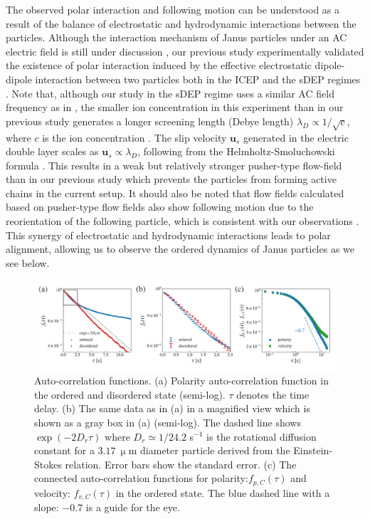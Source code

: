 \documentclass[%
 reprint,
 amsmath,amssymb,
 aps,
 floatfix
]{revtex4-2}
\begin{document}
The observed polar interaction and following motion can be understood as a result of the balance of electrostatic and hydrodynamic interactions between the particles.
Although the interaction mechanism of Janus particles under an AC electric field is still under discussion \cite{granick2016, nishiguchi2018a}, our previous study experimentally validated the existence of polar interaction induced by the effective electrostatic dipole-dipole interaction between two particles both in the ICEP and the sDEP regimes \cite{nishiguchi2018a}.
Note that, although our study in the sDEP regime uses a similar AC field frequency as in \cite{nishiguchi2018a}, the smaller ion concentration in this experiment than in our previous study generates a longer screening length (Debye length) $\lambda_D \propto 1/\sqrt{c}$, where $c$ is the ion concentration \cite{nishiguchi2018a}. 
The slip velocity $\bm{u}_s$ generated in the electric double layer scales as $\bm{u}_s \propto \lambda_D$, following from the Helmholtz-Smoluchowski formula \cite{squires2004}. 
This results in a weak but relatively stronger pusher-type flow-field than in our previous study \cite{nishiguchi2018a} which prevents the particles from forming active chains in the current setup.
It should also be noted that flow fields calculated based on pusher-type flow fields also show following motion due to the reorientation of the following particle, which is consistent with our observations \cite{lauga2009,stocker2012}.
This synergy of electrostatic and hydrodynamic interactions leads to polar alignment, allowing us to observe the ordered dynamics of Janus particles as we see below.

\begin{figure}[!t]
\includegraphics[width=2\columnwidth]{autocorr-4.pdf}
\caption{\label{auto_corr} Auto-correlation functions. 
(a) Polarity auto-correlation function in the ordered and disordered state (semi-log). $\tau$ denotes the time delay. 
(b) The same data as in (a) in a magnified view which is shown as a gray box in (a) (semi-log). The dashed line shows $\exp{\left(-2D_r \tau\right)}$ where $D_r \simeq 1/24.2$ s$^{-1}$ is the rotational diffusion constant for a $3.17\ \upmu\textrm{m}$ diameter particle derived from the Einstein-Stokes relation.
Error bars show the standard error. (c) The connected auto-correlation functions for polarity:$f_{p,C}(\tau)$ and velocity: $f_{v,C}(\tau)$ in the ordered state.
The blue dashed line with a slope: $-0.7$ is a guide for the eye.}
\end{figure}
\end{document}
